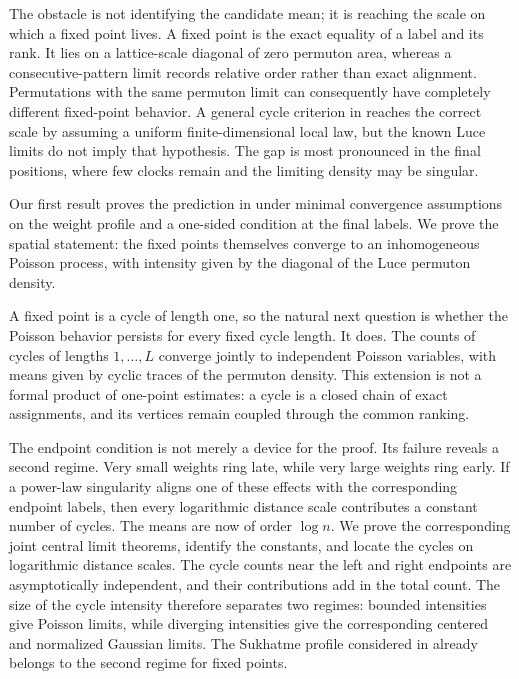 \documentclass[11pt]{article}
\theoremstyle{remark}
\theoremstyle{plain}
\begin{document}
The obstacle is not identifying the candidate mean; it is reaching the scale
on which a fixed point lives.  A fixed point is the exact equality of a label
and its rank.  It lies on a lattice-scale diagonal of zero permuton area,
whereas a consecutive-pattern limit records relative order rather than exact
alignment.  Permutations with the same permuton limit can consequently have
completely different fixed-point behavior.  A general cycle criterion in
\cite{mukherjee2016fixed} reaches the correct scale by assuming a uniform
finite-dimensional local law, but the known Luce limits do not imply that
hypothesis.  The gap is most pronounced in the final positions, where few
clocks remain and the limiting density may be singular.

Our first result proves the prediction in
\cite{borga2025permutonlocallimitsluce} under minimal convergence assumptions
on the weight profile and a one-sided condition at the final labels.  We prove
the spatial statement: the fixed points themselves converge to an
inhomogeneous Poisson process, with intensity given by the diagonal of the
Luce permuton density.

A fixed point is a cycle of length one, so the natural next question is
whether the Poisson behavior persists for every fixed cycle length.  It does.
The counts of cycles of lengths $1,\ldots,L$ converge jointly to independent
Poisson variables, with means given by cyclic traces of the permuton density.
This extension is not a formal product of one-point estimates: a cycle is a
closed chain of exact assignments, and its vertices remain coupled through
the common ranking.

The endpoint condition is not merely a device for the proof.  Its failure
reveals a second regime.  Very small weights ring late, while very large
weights ring early.  If a power-law singularity aligns one of these effects
with the corresponding endpoint labels, then every logarithmic distance
scale contributes a constant number of cycles.  The means are now of order
$\log n$.  We prove the corresponding joint central limit theorems, identify
the constants, and locate the cycles on logarithmic distance scales.  The
cycle counts near the left and right endpoints are asymptotically independent,
and their contributions add in the total count.  The size of the cycle
intensity therefore separates two regimes: bounded intensities give Poisson
limits, while diverging intensities give the corresponding centered and
normalized Gaussian limits.  The Sukhatme profile considered in
\cite{borga2025permutonlocallimitsluce} already belongs to the second regime
for fixed points.
\end{document}
